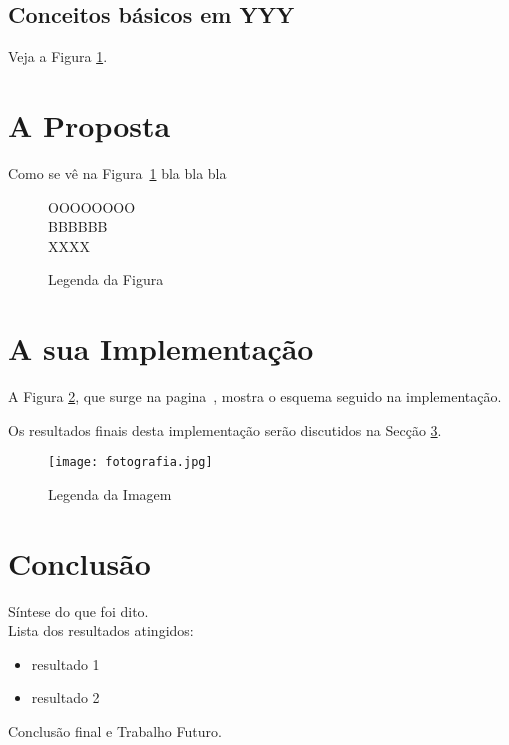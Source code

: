 \documentclass{article}
\begin{document}
\subsection{Conceitos básicos em YYY}
Veja a Figura \ref{figuraA}.

\section{A Proposta} \label{llll}
Como se vê na Figura~\ref{figuraA} bla bla bla
    \begin{figure}
        \begin{center}
OOOOOOOO\\
BBBBBB\\
XXXX
            \caption{Legenda da Figura} \label{figuraA}
        \end{center}
    \end{figure}

\section{A sua Implementação}
A Figura \ref{figuraB}, que surge na pagina~\pageref{figureB}, mostra o esquema seguido     na
implementação.

Os      resultados finais desta implementação serão discutidos na Secção \ref{concl}.

\begin{figure}[htbp]
\begin{center}
            \texttt{[image: fotografia.jpg]}
    \caption{Legenda da Imagem} \label{figuraB}
\end{center}
\end{figure}

\section{Conclusão} \label{concl}
Síntese do que foi dito.\\
Lista dos resultados atingidos:
\begin{itemize}
\item resultado 1
\item resultado 2
\end{itemize}
Conclusão final e Trabalho Futuro.
\end{document}
